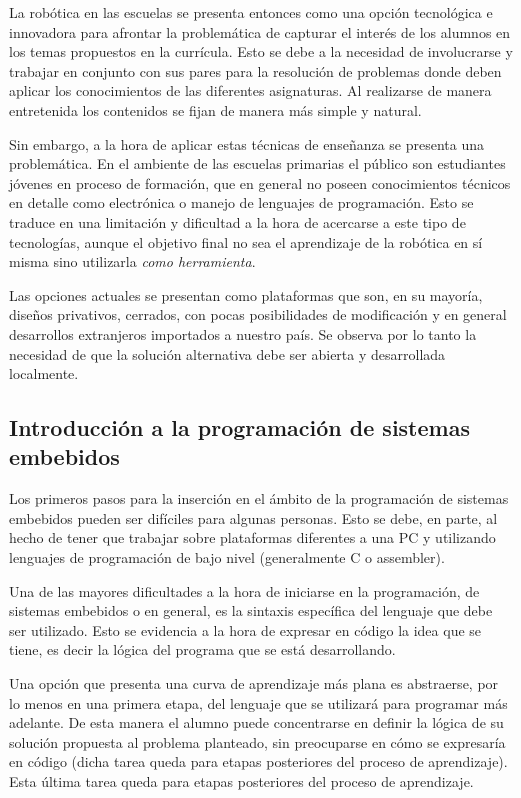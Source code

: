 La robótica en las escuelas se presenta entonces como una opción tecnológica e innovadora para afrontar la problemática de capturar el interés de los alumnos en los temas propuestos en la currícula. Esto se debe a la necesidad de involucrarse y trabajar en conjunto con sus pares para la resolución de problemas donde deben aplicar los conocimientos de las diferentes asignaturas. Al realizarse de manera entretenida los contenidos se fijan de manera más simple y natural.

Sin embargo, a la hora de aplicar estas técnicas de enseñanza se presenta una problemática. En el ambiente de las escuelas  primarias el público son estudiantes jóvenes en proceso de formación, que en general no poseen conocimientos técnicos en detalle como electrónica o manejo de lenguajes de programación. Esto se traduce en una limitación y dificultad a la hora de acercarse a este tipo de tecnologías, aunque el objetivo final no sea el aprendizaje de la robótica en sí misma sino utilizarla \textit{como herramienta}.

Las opciones actuales se presentan como plataformas que son, en su mayoría, diseños privativos, cerrados, con pocas posibilidades de modificación y en general desarrollos extranjeros importados a nuestro país. Se observa por lo tanto la necesidad de que la solución alternativa debe ser abierta y desarrollada localmente.

\subsection{Introducción a la programación de sistemas embebidos}
Los primeros pasos para la inserción en el ámbito de la programación de sistemas embebidos pueden ser difíciles para algunas personas. Esto se debe, en parte, al hecho de tener que trabajar sobre plataformas diferentes a una PC y utilizando lenguajes de programación de bajo nivel (generalmente C o assembler).

Una de las mayores dificultades a la hora de iniciarse en la programación, de sistemas embebidos o en general, es la sintaxis específica del lenguaje que debe ser utilizado. Esto se evidencia a la hora de expresar en código la idea que se tiene, es decir la lógica del programa que se está desarrollando.

Una opción que presenta una curva de aprendizaje más plana es abstraerse, por lo menos en una primera etapa, del lenguaje que se utilizará para programar más adelante. De esta manera el alumno puede concentrarse en definir la lógica de su solución propuesta al problema planteado, sin preocuparse en cómo se expresaría en código (dicha tarea queda para etapas posteriores del proceso de aprendizaje). Esta última tarea queda para etapas posteriores del proceso de aprendizaje.

